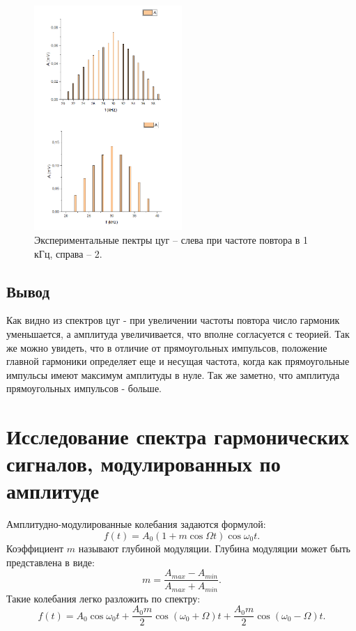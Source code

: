 \documentclass[a4paper, 14pt]{extarticle}%
\newcommand\ECaption[1]{%
     \captionsetup{font=footnotesize}%
     \caption{#1}}
\begin{document}
\begin{figure}[h!]
\begin{center}
\includegraphics[width=0.5\textwidth]{specb}
\end{center}
\ECaption{Экспериментальные пектры цуг -- слева при частоте повтора в 1 кГц, справа -- 2.}
\end{figure}
\newpage
\subsection*{Вывод}

Как видно из спектров цуг - при увеличении частоты повтора число гармоник уменьшается, а амплитуда увеличивается, что вполне согласуется с теорией. Так же можно увидеть, что в отличие от прямоугольных импульсов, положение главной гармоники определяет еще и несущая частота, когда как прямоугольные импульсы имеют максимум амплитуды в нуле.
Так же заметно, что амплитуда прямоугольных импульсов - больше.

\section*{Исследование спектра гармонических сигналов,
модулированных по амплитуде}

Амплитудно-модулированные колебания задаются формулой:
\[f(t) = A_0(1+m\cos\Omega t)\cos\omega_0t.\]
Коэффициент $m$ называют глубиной модуляции. Глубина модуляции может быть представлена в виде:
\[m = \dfrac{A_{max}-A_{min}}{A_{max}+A_{min}}.\]
Такие колебания легко разложить по спектру:
\begin{equation}
f(t) = A_0\cos\omega_0t + \frac{A_0m}{2}\cos(\omega_0+\Omega)t+ \frac{A_0m}{2}\cos(\omega_0-\Omega)t.
\end{equation}
\end{document}
